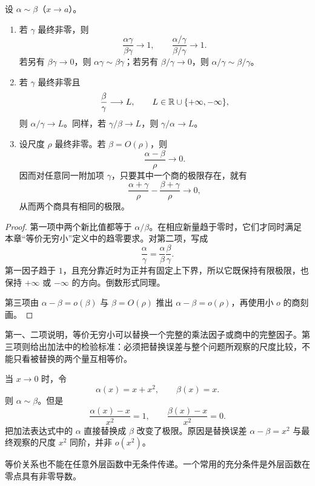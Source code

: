 \begin{theorem}[等价无穷小的代换]
\label{thm:equivalent-infinitesimal-substitution}
设 \(\alpha\sim\beta\)（\(x\to a\)）。
\begin{enumerate}
 \item 若 \(\gamma\) 最终非零，则
 \[
  \frac{\alpha\gamma}{\beta\gamma}\longrightarrow1,
  \qquad
  \frac{\alpha/\gamma}{\beta/\gamma}\longrightarrow1.
  \]
  若另有 \(\beta\gamma\to0\)，则
  \(\alpha\gamma\sim\beta\gamma\)；若另有 \(\beta/\gamma\to0\)，则
  \(\alpha/\gamma\sim\beta/\gamma\)。
 \item 若 \(\gamma\) 最终非零且
 \[
  \frac\beta\gamma\longrightarrow L,
  \qquad L\in\mathbb{R}\cup\{+\infty,-\infty\},
 \]
 则 \(\alpha/\gamma\to L\)。同样，若 \(\gamma/\beta\to L\)，则 \(\gamma/\alpha\to L\)。
 \item 设尺度 \(\rho\) 最终非零。若 \(\beta=O(\rho)\)，则
 \[
  \frac{\alpha-\beta}{\rho}\longrightarrow0.
 \]
 因而对任意同一附加项 \(\gamma\)，只要其中一个商的极限存在，就有
 \[
  \frac{\alpha+\gamma}{\rho}
  -\frac{\beta+\gamma}{\rho}\longrightarrow0,
 \]
 从而两个商具有相同的极限。
\end{enumerate}
\end{theorem}

\begin{proof}
第一项中两个新比值都等于 \(\alpha/\beta\)。在相应新量趋于零时，它们才同时满足本章“等价无穷小”定义中的趋零要求。对第二项，写成
\[
 \frac\alpha\gamma=\frac\alpha\beta\frac\beta\gamma.
\]
第一因子趋于 \(1\)，且充分靠近时为正并有固定上下界，所以它既保持有限极限，也保持 \(+\infty\) 或 \(-\infty\) 的方向。倒数形式同理。

第三项由 \(\alpha-\beta=o(\beta)\) 与 \(\beta=O(\rho)\) 推出 \(\alpha-\beta=o(\rho)\)，再使用小 \(o\) 的商刻画。
\end{proof}

第一、二项说明，等价无穷小可以替换一个完整的乘法因子或商中的完整因子。第三项则给出加法中的检验标准：必须把替换误差与整个问题所观察的尺度比较，不能只看被替换的两个量互相等价。

\begin{counterexample}[抵消使代换失效]
当 \(x\to0\) 时，令
\[
 \alpha(x)=x+x^2,\qquad\beta(x)=x.
\]
则 \(\alpha\sim\beta\)。但是
\[
 \frac{\alpha(x)-x}{x^2}=1,
 \qquad
 \frac{\beta(x)-x}{x^2}=0.
\]
把加法表达式中的 \(\alpha\) 直接替换成 \(\beta\) 改变了极限。原因是替换误差 \(\alpha-\beta=x^2\) 与最终观察的尺度 \(x^2\) 同阶，并非 \(o(x^2)\)。
\end{counterexample}

等价关系也不能在任意外层函数中无条件传递。一个常用的充分条件是外层函数在零点具有非零导数。

